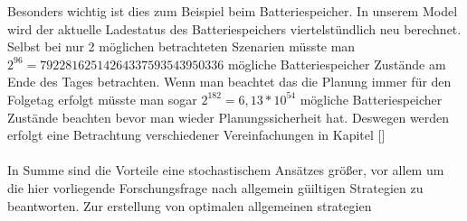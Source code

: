 Besonders wichtig ist dies zum Beispiel beim Batteriespeicher. In unserem Model wird der aktuelle Ladestatus des Batteriespeichers viertelstündlich neu berechnet. Selbst bei nur 2 möglichen betrachteten Szenarien
müsste man $ 2^{96} = 79228162514264337593543950336$ mögliche Batteriespeicher Zustände am Ende des Tages betrachten. Wenn man beachtet das die Planung immer für den Folgetag erfolgt
müsste man sogar $2^{182} = 6,13* 10^{54}$ mögliche Batteriespeicher Zustände beachten bevor man wieder Planungssicherheit hat. Deswegen werden erfolgt eine Betrachtung verschiedener Vereinfachungen in Kapitel []
\\
\\
In Summe sind die Vorteile eine stochastischem Ansätzes größer, vor allem um die hier vorliegende Forschungsfrage nach allgemein güiltigen Strategien
zu beantworten.
Zur erstellung von optimalen allgemeinen strategien \\



